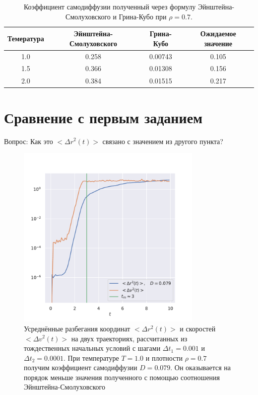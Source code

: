 \documentclass[a4paper,12pt]{article}
\begin{document}
\begin{table}[H]
    \centering
    \caption{Коэффициент самодиффузии полученный через
    формулу Эйнштейна-Смолуховского и Грина-Кубо при 
\(\rho = 0.7\).}
    \label{tab:label}
    \begin{tabular}{|c | c | c | c |}
        \hline
        Темература & Эйнштейна-Смолуховского & Грина-Кубо 
                   & Ожидаемое значение\\
        \hline
        \hline
        1.0 & 0.258 & 0.00743 & {\color{red}0.105} \\
        1.5 & 0.366 & 0.01308 & {\color{red}0.156} \\
        2.0 & 0.384 & 0.01515 & {\color{red}0.217} \\
        \hline
    \end{tabular}
\end{table}

\section{Сравнение с первым заданием}

{\color{red} Вопрос: Как это \(<\Delta r^2(t)>\)
связано с значением из другого пункта?}

\begin{figure}[H]
    \centering
    \includegraphics[width=0.8\textwidth]{../../media/tm.pdf}
\caption{Усреднённые разбегания координат \(<\Delta r^2(t)>\) 
и скоростей \(<\Delta v^2(t)>\) на двух траекториях,
рассчитанных из тождественных начальных условий с 
шагами \(\Delta t_1 = 0.001\) и \(\Delta t_2 = 0.0001\).
При температуре \(T = 1.0\) и плотности 
\(\rho = 0.7\) получим коэффициент
самодиффузии \(D = 0.079\). Он оказывается на порядок
меньше значения полученного с помощью соотношения
Эйнштейна-Смолуховского}
\end{figure}
\end{document}
